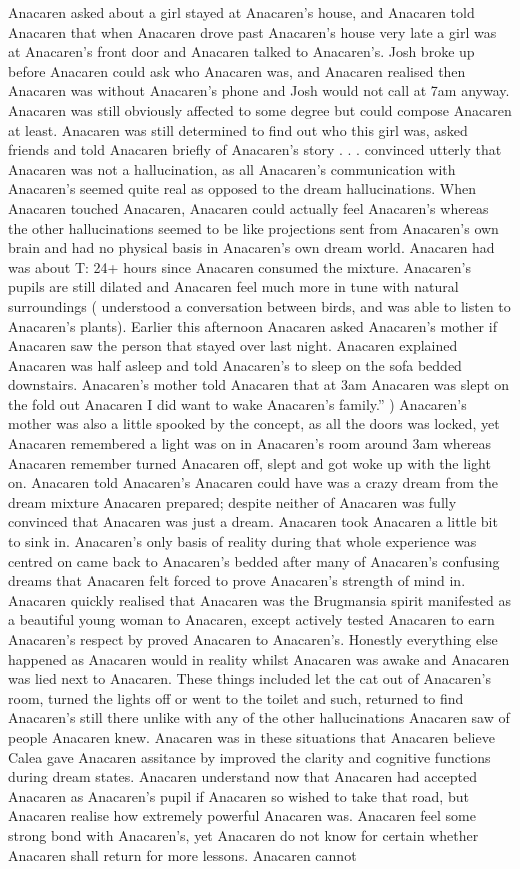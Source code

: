 \documentclass[12pt]{book}
\begin{document}
Anacaren asked about a girl stayed at Anacaren's house, and Anacaren told Anacaren that when Anacaren drove past Anacaren's house very late a girl was at Anacaren's front door and Anacaren talked to Anacaren's. Josh broke up before Anacaren could ask who Anacaren was, and Anacaren realised then Anacaren was without Anacaren's phone and Josh would not call at 7am anyway. Anacaren was still obviously affected to some degree but could compose Anacaren at least. Anacaren was still determined to find out who this girl was, asked friends and told Anacaren briefly of Anacaren's story . . .  convinced utterly that Anacaren was not a hallucination, as all Anacaren's communication with Anacaren's seemed quite real as opposed to the dream hallucinations. When Anacaren touched Anacaren, Anacaren could actually feel Anacaren's whereas the other hallucinations seemed to be like projections sent from Anacaren's own brain and had no physical basis in Anacaren's own dream world. Anacaren had was about T: 24+ hours since Anacaren consumed the mixture. Anacaren's pupils are still dilated and Anacaren feel much more in tune with natural surroundings ( understood a conversation between birds, and was able to listen to Anacaren's plants). Earlier this afternoon Anacaren asked Anacaren's mother if Anacaren saw the person that stayed over last night. Anacaren explained Anacaren was half asleep and told Anacaren's to sleep on the sofa bedded downstairs. Anacaren's mother told Anacaren that at 3am Anacaren was slept on the fold out Anacaren I did want to wake Anacaren's family.'' ) Anacaren's mother was also a little spooked by the concept, as all the doors was locked, yet Anacaren remembered a light was on in Anacaren's room around 3am whereas Anacaren remember turned Anacaren off, slept and got woke up with the light on. Anacaren told Anacaren's Anacaren could have was a crazy dream from the dream mixture Anacaren prepared; despite neither of Anacaren was fully convinced that Anacaren was just a dream. Anacaren took Anacaren a little bit to sink in. Anacaren's only basis of reality during that whole experience was centred on came back to Anacaren's bedded after many of Anacaren's confusing dreams that Anacaren felt forced to prove Anacaren's strength of mind in. Anacaren quickly realised that Anacaren was the Brugmansia spirit manifested as a beautiful young woman to Anacaren, except actively tested Anacaren to earn Anacaren's respect by proved Anacaren to Anacaren's. Honestly everything else happened as Anacaren would in reality whilst Anacaren was awake and Anacaren was lied next to Anacaren. These things included let the cat out of Anacaren's room, turned the lights off or went to the toilet and such, returned to find Anacaren's still there unlike with any of the other hallucinations Anacaren saw of people Anacaren knew. Anacaren was in these situations that Anacaren believe Calea gave Anacaren assitance by improved the clarity and cognitive functions during dream states. Anacaren understand now that Anacaren had accepted Anacaren as Anacaren's pupil if Anacaren so wished to take that road, but Anacaren realise how extremely powerful Anacaren was. Anacaren feel some strong bond with Anacaren's, yet Anacaren do not know for certain whether Anacaren shall return for more lessons. Anacaren cannot 
\end{document}

